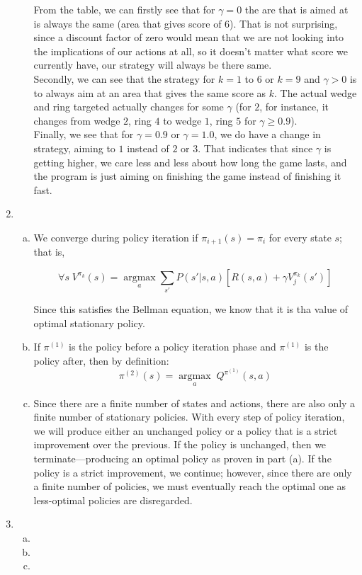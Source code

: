 \documentclass{article}
\begin{document}
\begin{enumerate}
\begin{enumerate}[(a)]
From the table, we can firstly see that for $\gamma=0$ the are that is aimed at is always the same (area that gives score of $6$). That is not surprising, since a discount factor of zero would mean that we are not looking into the implications of our actions at all, so it doesn't matter what score we currently have, our strategy will always be there same.\\

Secondly, we can see that the strategy for $k=1$ to $6$ or $k=9$ and $\gamma>0$ is to always aim at an area that gives the same score as $k$. The actual wedge and ring targeted actually changes for some $\gamma$ (for $2$, for instance, it changes from wedge $2$, ring $4$ to wedge $1$, ring $5$ for $\gamma\ge0.9$).\\

Finally, we see that for $\gamma=0.9$ or $\gamma=1.0$, we do have a change in strategy,  aiming to $1$ instead of $2$ or $3$. That indicates that since $\gamma$ is getting higher, we care less and less about how long the game lasts, and the program is just aiming on finishing the game instead of finishing it fast.
            \end{enumerate}        
        \item
            \begin{enumerate}[(a)]
                \item We converge during policy iteration if $\pi_{i+1}(s) = \pi_{i}$ for every state $s$; that is, 

                $$\forall s \; V^{\pi_k}(s) = \underset{a}{\operatorname{argmax}} \sum_{s'} P(s' | s, a) [R(s, a) + \gamma V_j^{\pi_k}(s')]$$

                Since this satisfies the Bellman equation, we know that it is tha value of optimal stationary policy.
                \item If $\pi^{(1)}$ is the policy before a policy iteration phase and $\pi^{(1)}$ is the policy after, then by definition: $$\pi^{(2)}(s) = \underset{a}{\operatorname{argmax}} \; Q^{\pi^{(1)}}(s, a)$$

                
                \item Since there are a finite number of states and actions, there are also only a finite number of stationary policies. With every step of policy iteration, we will produce either an unchanged policy or a policy that is a strict improvement over the previous. If the policy is unchanged, then we terminate---producing an optimal policy as proven in part (a). If the policy is a strict improvement, we continue; however, since there are only a finite number of policies, we must eventually reach the optimal one as less-optimal policies are disregarded.
            \end{enumerate}        
        \item
            \begin{enumerate}[(a)]
                \item %
                \item %
                \item %
            \end{enumerate}                
    \end{enumerate}
\end{document}
